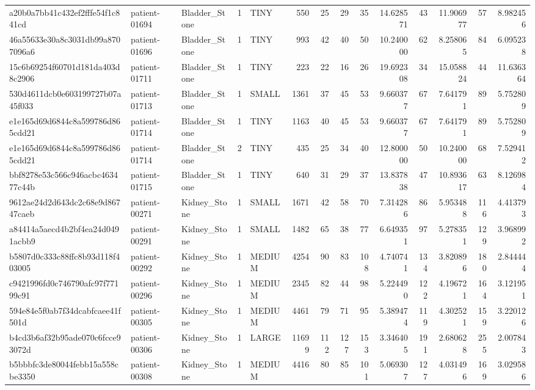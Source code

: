\begin{tabular}{lllrlrrrrrrrrr}
a20b0a7bb41c432ef2fffe54f1c841cd & patient-01694 & Bladder_Stone & 1 & TINY & 550 & 25 & 29 & 35 & 14.628571 & 43 & 11.906977 & 57 & 8.982456 \\
46a55633e30a8c3031db99a8707096a6 & patient-01696 & Bladder_Stone & 1 & TINY & 993 & 42 & 40 & 50 & 10.240000 & 62 & 8.258065 & 84 & 6.095238 \\
15c6b69254f60701d181da403d8c2906 & patient-01711 & Bladder_Stone & 1 & TINY & 223 & 22 & 16 & 26 & 19.692308 & 34 & 15.058824 & 44 & 11.636364 \\
530d4611dcb0e603199727b07a45f033 & patient-01713 & Bladder_Stone & 1 & SMALL & 1361 & 37 & 45 & 53 & 9.660377 & 67 & 7.641791 & 89 & 5.752809 \\
e1e165d69d6844c8a599786d865cdd21 & patient-01714 & Bladder_Stone & 1 & TINY & 1163 & 40 & 45 & 53 & 9.660377 & 67 & 7.641791 & 89 & 5.752809 \\
e1e165d69d6844c8a599786d865cdd21 & patient-01714 & Bladder_Stone & 2 & TINY & 435 & 25 & 34 & 40 & 12.800000 & 50 & 10.240000 & 68 & 7.529412 \\
bbf8278e53c566c946acbc463477c44b & patient-01715 & Bladder_Stone & 1 & TINY & 640 & 31 & 29 & 37 & 13.837838 & 47 & 10.893617 & 63 & 8.126984 \\
9612ae24d2d643dc2c68e9d86747caeb & patient-00271 & Kidney_Stone & 1 & SMALL & 1671 & 42 & 58 & 70 & 7.314286 & 86 & 5.953488 & 116 & 4.413793 \\
a84414a5aecd4b2bf4ea24d0491acbb9 & patient-00291 & Kidney_Stone & 1 & SMALL & 1482 & 65 & 38 & 77 & 6.649351 & 97 & 5.278351 & 129 & 3.968992 \\
b5807d0c333c88ffc8b93d118f403005 & patient-00292 & Kidney_Stone & 1 & MEDIUM & 4254 & 90 & 83 & 108 & 4.740741 & 134 & 3.820896 & 180 & 2.844444 \\
c9421996fd0c746790afc97f77199c91 & patient-00296 & Kidney_Stone & 1 & MEDIUM & 2345 & 82 & 44 & 98 & 5.224490 & 122 & 4.196721 & 164 & 3.121951 \\
594e84e5f0ab7f34dcabfcaee41f501d & patient-00305 & Kidney_Stone & 1 & MEDIUM & 4461 & 79 & 71 & 95 & 5.389474 & 119 & 4.302521 & 159 & 3.220126 \\
b4cd3b6af32b95ade070c6fcce93072d & patient-00306 & Kidney_Stone & 1 & LARGE & 11699 & 112 & 127 & 153 & 3.346405 & 191 & 2.680628 & 255 & 2.007843 \\
b5bbbfc3de80044febb15a558cbe3350 & patient-00308 & Kidney_Stone & 1 & MEDIUM & 4416 & 80 & 85 & 101 & 5.069307 & 127 & 4.031496 & 169 & 3.029586 \\

\end{tabular}
